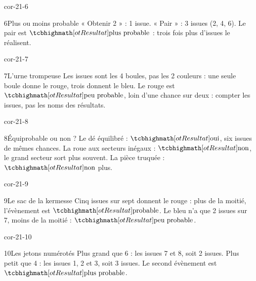 \begin{blocLivre}{cor-21-6}\begin{corrige}{6}{Plus ou moins probable}
« Obtenir 2 » : 1 issue. « Pair » : 3 issues (2, 4, 6). Le pair est $\res{\text{plus probable}}$ : trois fois plus d’issues le réalisent.
\label{fig-cor-21-6}
\end{corrige}\end{blocLivre}
\begin{blocLivre}{cor-21-7}\begin{corrige}{7}{L’urne trompeuse}
Les issues sont les 4 boules, pas les 2 couleurs : une seule boule donne le rouge, trois donnent le bleu. Le rouge est $\res{\text{peu probable}}$, loin d’une chance sur deux : compter les issues, pas les noms des résultats.
\label{fig-cor-21-7}
\end{corrige}\end{blocLivre}
\begin{blocLivre}{cor-21-8}\begin{corrige}{8}{Équiprobable ou non ?}
Le dé équilibré : $\res{\text{oui}}$, six issues de mêmes chances. La roue aux secteurs inégaux : $\res{\text{non}}$, le grand secteur sort plus souvent. La pièce truquée : $\res{\text{non}}$ plus.
\label{fig-cor-21-8}
\end{corrige}\end{blocLivre}
\begin{blocLivre}{cor-21-9}\begin{corrige}{9}{Le sac de la kermesse}
Cinq issues sur sept donnent le rouge : plus de la moitié, l’évènement est $\res{\text{probable}}$. Le bleu n’a que 2 issues sur 7, moins de la moitié : $\res{\text{peu probable}}$.
\label{fig-cor-21-9}
\end{corrige}\end{blocLivre}
\begin{blocLivre}{cor-21-10}\begin{corrige}{10}{Les jetons numérotés}
Plus grand que 6 : les issues 7 et 8, soit 2 issues. Plus petit que 4 : les issues 1, 2 et 3, soit 3 issues. Le second évènement est $\res{\text{plus probable}}$.
\end{corrige}\end{blocLivre}

